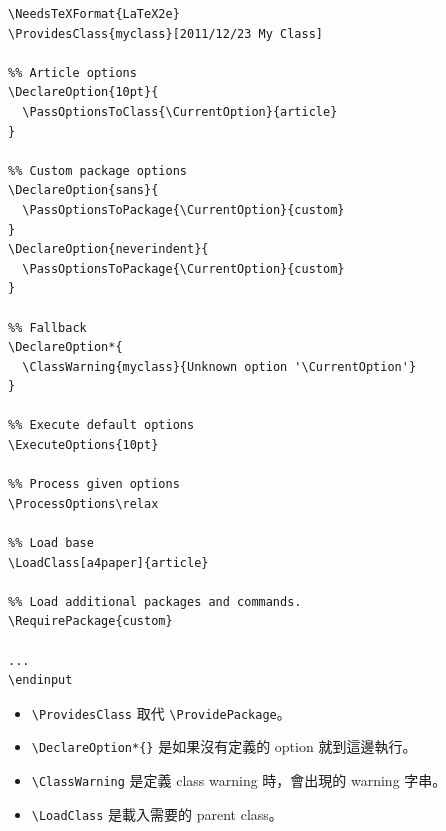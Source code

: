   \begin{verbatim}
\NeedsTeXFormat{LaTeX2e}
\ProvidesClass{myclass}[2011/12/23 My Class]

%% Article options
\DeclareOption{10pt}{
  \PassOptionsToClass{\CurrentOption}{article}
}

%% Custom package options
\DeclareOption{sans}{
  \PassOptionsToPackage{\CurrentOption}{custom}
}
\DeclareOption{neverindent}{
  \PassOptionsToPackage{\CurrentOption}{custom}
}

%% Fallback
\DeclareOption*{
  \ClassWarning{myclass}{Unknown option '\CurrentOption'}
}

%% Execute default options
\ExecuteOptions{10pt}

%% Process given options
\ProcessOptions\relax

%% Load base
\LoadClass[a4paper]{article}

%% Load additional packages and commands.
\RequirePackage{custom}

...
\endinput
  \end{verbatim}
  \begin{itemize}
    \item \verb=\ProvidesClass= 取代 \verb=\ProvidePackage=。
    \item \verb=\DeclareOption*{}= 是如果沒有定義的 option 就到這邊執行。
    \item \verb=\ClassWarning= 是定義 class warning 時，會出現的 warning 字串。
    \item \verb=\LoadClass= 是載入需要的 parent class。
  \end{itemize}
